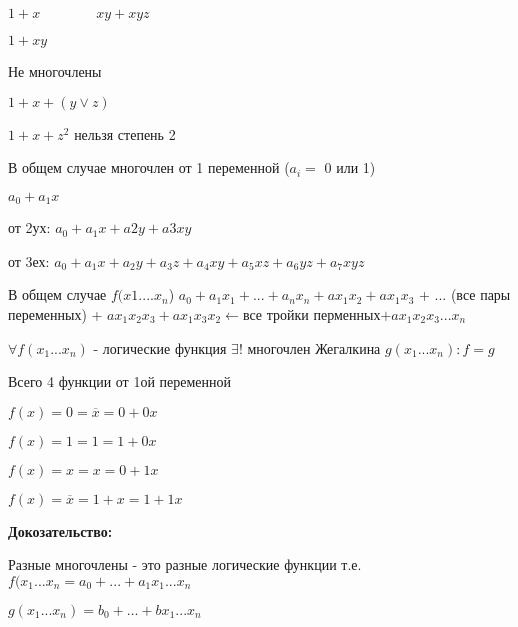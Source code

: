 \documentclass[russian]{lecture-notes}
\begin{document}
\begin{sloppypar}
\begin{proposition}
\begin{example}
        $1 + x \qquad \qquad xy+xyz$
        
        $1 + xy$
    \end{example}
    
    Не многочлены
    
    $1 + x + (y \lor z)$
    
    $1 + x + z^{2}$ нельзя степень 2
    
    
    \begin{remark}
        В общем случае многочлен от 1 переменной ($a_{i} =$ 0 или 1)
        
        $a_{0} + a_{1}x$
        
        от 2ух: $a_{0} + a_{1}x+a{2}y+a{3}xy$
        
        от 3ех: $a_{0} + a_{1}x + a_{2}y + a_{3}z + a_{4}xy + a_{5}xz + a_{6}yz + a_{7}xyz$
        
        \end{remark}
        
        В общем случае $f(x1....x_{n}$) $a_{0} + a_{1}x_{1} + ... + a_{n}x_{n} + ax_{1}x_{2} + ax_{1}x_{3}$ + ... (все пары переменных) + $ ax_{1}x_{2}x_{3}+ax_{1}x_{3}x_{2} \leftarrow $все тройки перменных$ + ax_{1}x_{2}x_{3}...x_{n}$
        
        \begin{definition}
            $\forall f(x_{1}...x_{n})$ - логические функция $\exists!$ многочлен Жегалкина $g(x_{1}...x_{n}) : f = g$
        \end{definition}
        
        \begin{remark}
            Всего 4 функции от 1ой переменной
            
            $f(x) = 0 = \overline{x} = 0 + 0x$
            
            $f(x) = 1 = 1 = 1 + 0x$
            
            $f(x) = x = x = 0 + 1x$
            
           $f(x) = \overline{x} = 1 + x = 1 + 1x$
        \end{remark}
    
    \textbf{Докозательство:}
    
        \begin{definition}
            Разные многочлены - это разные логические функции т.е. $f(x_{1} ... x_{n} = a_{0} + ... + a_{1}x_{1} ... x_{n}$
            
            $g(x_{1}...x_{n}) = b_{0} + ... + bx_{1} ... x_{n}$
            

\end{definition}
\end{proposition}
\end{sloppypar}
\end{document}
